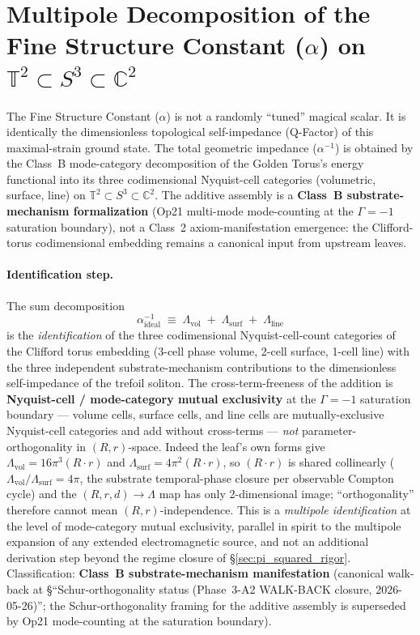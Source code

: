 \section{Multipole Decomposition of the Fine Structure Constant ($\alpha$) on $\mathbb{T}^2 \subset S^3 \subset \mathbb{C}^2$}
\label{sec:alpha_decomposition}

The Fine Structure Constant ($\alpha$) is not a randomly ``tuned'' magical scalar. It is identically the dimensionless topological self-impedance (Q-Factor) of this maximal-strain ground state. The total geometric impedance ($\alpha^{-1}$) is obtained by the Class~B mode-category decomposition of the Golden Torus's energy functional into its three codimensional Nyquist-cell categories (volumetric, surface, line) on $\mathbb{T}^2 \subset S^3 \subset \mathbb{C}^2$. The additive assembly is a \textbf{Class~B substrate-mechanism formalization} (Op21 multi-mode mode-counting at the $\Gamma = -1$\gammaundeclared{} saturation boundary), not a Class~2 axiom-manifestation emergence: the Clifford-torus codimensional embedding remains a canonical input from upstream leaves.

\paragraph{Identification step.} The sum decomposition
\[
\alpha^{-1}_{\text{ideal}} \;\equiv\; \Lambda_{\text{vol}} \;+\; \Lambda_{\text{surf}} \;+\; \Lambda_{\text{line}}
\]
is the \emph{identification} of the three codimensional Nyquist-cell-count categories of the Clifford torus embedding (3-cell phase volume, 2-cell surface, 1-cell line) with the three independent substrate-mechanism contributions to the dimensionless self-impedance of the trefoil soliton. The cross-term-freeness of the addition is \textbf{Nyquist-cell / mode-category mutual exclusivity} at the $\Gamma = -1$\gammaundeclared{} saturation boundary --- volume cells, surface cells, and line cells are mutually-exclusive Nyquist-cell categories and add without cross-terms --- \emph{not} parameter-orthogonality in $(R, r)$-space. Indeed the leaf's own forms give $\Lambda_{\text{vol}} = 16\pi^3(R \cdot r)$ and $\Lambda_{\text{surf}} = 4\pi^2(R \cdot r)$, so $(R \cdot r)$ is shared collinearly ($\Lambda_{\text{vol}}/\Lambda_{\text{surf}} = 4\pi$, the substrate temporal-phase closure per observable Compton cycle) and the $(R, r, d) \to \Lambda$ map has only 2-dimensional image; ``orthogonality'' therefore cannot mean $(R, r)$-independence. This is a \emph{multipole identification} at the level of mode-category mutual exclusivity, parallel in spirit to the multipole expansion of any extended electromagnetic source, and not an additional derivation step beyond the regime closure of \S\ref{sec:pi_squared_rigor}. Classification: \textbf{Class~B substrate-mechanism manifestation} (canonical walk-back at  \S``Schur-orthogonality status (Phase~3-A2 WALK-BACK closure, 2026-05-26)''; the Schur-orthogonality framing for the additive assembly is superseded by Op21 mode-counting at the saturation boundary).

